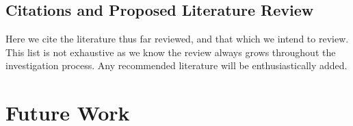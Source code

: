 \documentclass{article}
\begin{document}


\subsection{Citations and Proposed Literature Review}

Here we cite the literature thus far reviewed, and that which we intend to review. This list is not exhaustive as we know the review always grows throughout the investigation process. Any recommended literature will be enthusiastically added.

\nocite{*}



\section{Future Work}





% 
\end{document}
